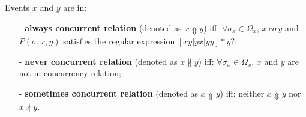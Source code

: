 \documentclass{llncs}
\begin{document}
\begin{definition}\label{def:extendedConcurrent}
Events $x$ and $y$ are in:
	\begin{itemize}
		\item[-] \textbf{always concurrent relation} (denoted as $x\Updownarrow y$) iff: $\forall\sigma_{x}\in\Omega_{x}$, $x~co~y$ and $P(\sigma,x,y)$ satisfies the regular expression $[xy|yx|yy]*y?$;
		\item[-] \textbf{never concurrent relation} (denoted as $x\nparallel y$) iff: $\forall\sigma_{x}\in\Omega_{x}$, $x$ and $y$ are not in concurrency relation;
		\item[-] \textbf{sometimes concurrent relation} (denoted as $x\Uparrow y$) iff: neither $x\Updownarrow y$ nor $x\nparallel y$.
	\end{itemize}
\end{definition}
\end{document}

